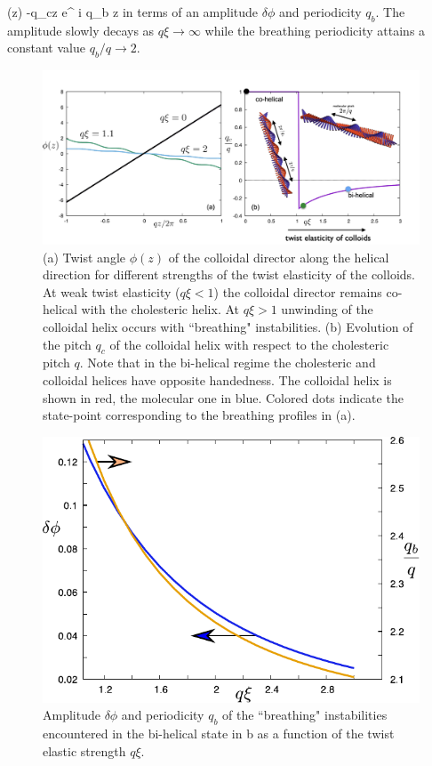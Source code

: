 \beq
\phi(z) -q_{c}z \approx   \delta \phi e^{  i q_{b} z }
\label{nlinrip}
\eeq
in terms of an amplitude $\delta \phi$ and periodicity $q_{b}$. The amplitude slowly decays as $q \xi \rightarrow \infty $ while the breathing periodicity attains a constant value $q_{b}/q \rightarrow 2$.


   \begin{figure}
	\includegraphics[width =  \columnwidth]{figures/chapter-4/bihelical}
	\caption{ (a) Twist angle $\phi(z)$ of the colloidal director along the helical direction for different strengths of the twist elasticity of the colloids. At weak twist elasticity  ($q \xi <1$) the colloidal director remains co-helical with the cholesteric helix.  At $q \xi >1$ unwinding of the colloidal helix occurs with  ``breathing" instabilities.   (b) Evolution of the pitch $q_{c}$ of the colloidal helix with respect to the cholesteric pitch $q$. Note that in the bi-helical regime the cholesteric and colloidal helices have opposite handedness. The colloidal helix is shown in red, the molecular one in blue.   Colored dots indicate the  state-point corresponding to the breathing profiles in (a). }
	\label{unwind}
\end{figure}


 \begin{figure}
	\includegraphics[width = .6\columnwidth]{figures/chapter-4/fluctuations}
	\caption{ Amplitude $\delta \phi$ and periodicity $q_{b}$ of the ``breathing" instabilities encountered in the bi-helical state in b as a function of the twist elastic strength $q \xi$. }
	\label{fluc}
\end{figure}

